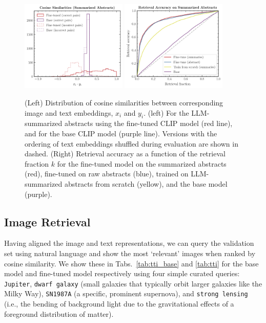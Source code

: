 \documentclass[10pt]{article} %
\begin{document}
\begin{figure}[!h]
  \includegraphics[width=0.45\textwidth]{plots/sim_val.pdf}
  \includegraphics[width=0.45\textwidth]{plots/retrieval.pdf}
  \caption{(Left) Distribution of cosine similarities between corresponding image and text embeddings, $x_i$ and $y_i$. (left) For the LLM-summarized abstracts using the fine-tuned CLIP model (red line), and for the base CLIP model (purple line). Versions with the ordering of text embeddings shuffled during evaluation are shown in dashed. (Right) Retrieval accuracy as a function of the retrieval fraction $k$ for the fine-tuned model on the summarized abstracts (red), fine-tuned on raw abstracts (blue), trained on LLM-summarized abstracts from scratch (yellow), and the base model (purple).}
  \label{fig:sim_valtrain}
  \end{figure}

\subsection{Image Retrieval}

Having aligned the image and text representations, we can query the validation set using natural language and show the most `relevant' images when ranked by cosine similarity.
%
We show these in Tabs.~\ref{tab:tti_base} and \ref{tab:tti} for the base model and fine-tuned model respectively using four simple curated queries: \texttt{Jupiter}, \texttt{dwarf galaxy} (small galaxies that typically orbit larger galaxies like the Milky Way), \texttt{SN1987A} (a specific, prominent supernova), and \texttt{strong lensing} (i.e., the bending of background light due to the gravitational effects of a foreground distribution of matter).
\end{document}
